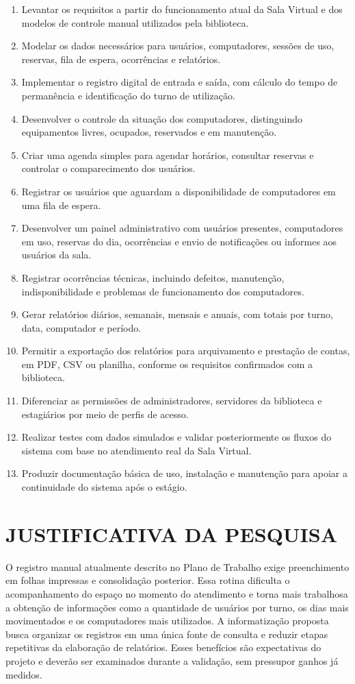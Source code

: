 \documentclass[12pt,a4paper]{article}
\newcommand{\secao}[1]{\clearpage\section{#1}}
\begin{document}
\begin{enumerate}
  \item Levantar os requisitos a partir do funcionamento atual da Sala Virtual e dos modelos de controle manual utilizados pela biblioteca.
  \item Modelar os dados necessários para usuários, computadores, sessões de uso, reservas, fila de espera, ocorrências e relatórios.
  \item Implementar o registro digital de entrada e saída, com cálculo do tempo de permanência e identificação do turno de utilização.
  \item Desenvolver o controle da situação dos computadores, distinguindo equipamentos livres, ocupados, reservados e em manutenção.
  \item Criar uma agenda simples para agendar horários, consultar reservas e controlar o comparecimento dos usuários.
  \item Registrar os usuários que aguardam a disponibilidade de computadores em uma fila de espera.
  \item Desenvolver um painel administrativo com usuários presentes, computadores em uso, reservas do dia, ocorrências e envio de notificações ou informes aos usuários da sala.
  \item Registrar ocorrências técnicas, incluindo defeitos, manutenção, indisponibilidade e problemas de funcionamento dos computadores.
  \item Gerar relatórios diários, semanais, mensais e anuais, com totais por turno, data, computador e período.
  \item Permitir a exportação dos relatórios para arquivamento e prestação de contas, em PDF, CSV ou planilha, conforme os requisitos confirmados com a biblioteca.
  \item Diferenciar as permissões de administradores, servidores da biblioteca e estagiários por meio de perfis de acesso.
  \item Realizar testes com dados simulados e validar posteriormente os fluxos do sistema com base no atendimento real da Sala Virtual.
  \item Produzir documentação básica de uso, instalação e manutenção para apoiar a continuidade do sistema após o estágio.
\end{enumerate}

\secao{JUSTIFICATIVA DA PESQUISA}

O registro manual atualmente descrito no Plano de Trabalho exige preenchimento em folhas impressas e consolidação posterior. Essa rotina dificulta o acompanhamento do espaço no momento do atendimento e torna mais trabalhosa a obtenção de informações como a quantidade de usuários por turno, os dias mais movimentados e os computadores mais utilizados. A informatização proposta busca organizar os registros em uma única fonte de consulta e reduzir etapas repetitivas da elaboração de relatórios. Esses benefícios são expectativas do projeto e deverão ser examinados durante a validação, sem pressupor ganhos já medidos.
\end{document}
